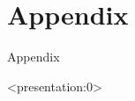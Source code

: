 \documentclass[12pt, aspectratio=169, xcolor=dvipsnames]{beamer}  %
\begin{document}
\section{Appendix}

\begin{frame}
	\begin{center}
		\huge \textcolor{yaleblue}{Appendix}
	\end{center}
\end{frame}

\begin{frame}<presentation:0>
	 
	
\end{frame}
\end{document}
